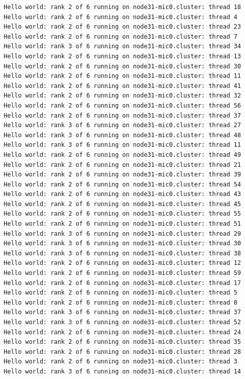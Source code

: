 \documentclass[pscyr,10pt]{hedlab}
\begin{document}
\begin{lstlisting}
  Hello world: rank 2 of 6 running on node31-mic0.cluster: thread 18
  Hello world: rank 2 of 6 running on node31-mic0.cluster: thread 4
  Hello world: rank 2 of 6 running on node31-mic0.cluster: thread 23
  Hello world: rank 2 of 6 running on node31-mic0.cluster: thread 7
  Hello world: rank 3 of 6 running on node31-mic0.cluster: thread 34
  Hello world: rank 2 of 6 running on node31-mic0.cluster: thread 13
  Hello world: rank 2 of 6 running on node31-mic0.cluster: thread 30
  Hello world: rank 2 of 6 running on node31-mic0.cluster: thread 11
  Hello world: rank 2 of 6 running on node31-mic0.cluster: thread 41
  Hello world: rank 2 of 6 running on node31-mic0.cluster: thread 32
  Hello world: rank 2 of 6 running on node31-mic0.cluster: thread 56
  Hello world: rank 2 of 6 running on node31-mic0.cluster: thread 37
  Hello world: rank 3 of 6 running on node31-mic0.cluster: thread 27
  Hello world: rank 3 of 6 running on node31-mic0.cluster: thread 48
  Hello world: rank 3 of 6 running on node31-mic0.cluster: thread 11
  Hello world: rank 2 of 6 running on node31-mic0.cluster: thread 49
  Hello world: rank 2 of 6 running on node31-mic0.cluster: thread 21
  Hello world: rank 2 of 6 running on node31-mic0.cluster: thread 39
  Hello world: rank 2 of 6 running on node31-mic0.cluster: thread 54
  Hello world: rank 2 of 6 running on node31-mic0.cluster: thread 43
  Hello world: rank 2 of 6 running on node31-mic0.cluster: thread 45
  Hello world: rank 2 of 6 running on node31-mic0.cluster: thread 55
  Hello world: rank 2 of 6 running on node31-mic0.cluster: thread 51
  Hello world: rank 3 of 6 running on node31-mic0.cluster: thread 29
  Hello world: rank 3 of 6 running on node31-mic0.cluster: thread 30
  Hello world: rank 3 of 6 running on node31-mic0.cluster: thread 38
  Hello world: rank 2 of 6 running on node31-mic0.cluster: thread 12
  Hello world: rank 2 of 6 running on node31-mic0.cluster: thread 59
  Hello world: rank 2 of 6 running on node31-mic0.cluster: thread 17
  Hello world: rank 2 of 6 running on node31-mic0.cluster: thread 5
  Hello world: rank 2 of 6 running on node31-mic0.cluster: thread 8
  Hello world: rank 3 of 6 running on node31-mic0.cluster: thread 37
  Hello world: rank 3 of 6 running on node31-mic0.cluster: thread 52
  Hello world: rank 2 of 6 running on node31-mic0.cluster: thread 24
  Hello world: rank 2 of 6 running on node31-mic0.cluster: thread 35
  Hello world: rank 2 of 6 running on node31-mic0.cluster: thread 28
  Hello world: rank 2 of 6 running on node31-mic0.cluster: thread 3
  Hello world: rank 3 of 6 running on node31-mic0.cluster: thread 14

\end{lstlisting}
\end{document}
